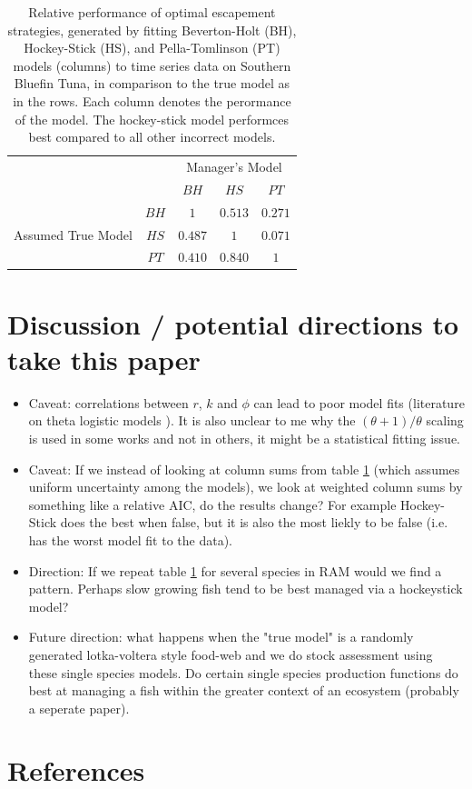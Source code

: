 \documentclass[]{elsarticle} %
\begin{document}
\begin{table}[!htbp]
	\setlength{\extrarowheight}{2pt}
	\begin{tabular}{cc|c|c|c|}
		& \multicolumn{1}{c}{} & \multicolumn{3}{c}{Manager's Model} \\
		& \multicolumn{1}{c}{} & \multicolumn{1}{c}{$BH$}  & \multicolumn{1}{c}{$HS$}  & \multicolumn{1}{c}{$PT$} \\\cline{3-5}
		& $BH$ & $1$ & $0.513$ & $0.271$ \\ \cline{3-5}
		Assumed True Model  & $HS$ & $0.487$ & $1$ & $0.071$ \\\cline{3-5}
		& $PT$ & $0.410$ & $0.840$ & $1$ \\\cline{3-5}
	\end{tabular}
	\caption{Relative performance of optimal escapement strategies, generated by fitting Beverton-Holt (BH), Hockey-Stick (HS), and Pella-Tomlinson (PT) models (columns) to time series data on Southern Bluefin Tuna, in comparison to the true model as in the rows. Each column denotes the perormance of the model. The hockey-stick model performces best compared to all other incorrect models.}\label{table:tuna}
\end{table}

\section{Discussion / potential directions to take this paper}

\begin{itemize}
	\item Caveat: correlations between $r$, $k$ and $\phi$ can lead to poor model fits (literature on theta logistic models \citep{polansky2009,clark2010theta} ). It is also unclear to me why the $(\theta + 1)/\theta$ scaling is used in some works and not in others, it might be a statistical fitting issue.
	\item Caveat: If we instead of looking at column sums from  table \ref{table:tuna} (which assumes uniform uncertainty among the models), we look at weighted column sums by something like a relative AIC, do the results change? For example Hockey-Stick does the best when false, but it is also the most liekly to be false (i.e. has the worst model fit to the data).
	\item Direction: If we repeat table \ref{table:tuna} for several species in RAM would we find a pattern. Perhaps slow growing fish tend to be best managed via a hockeystick model?
	\item Future direction: what happens when the "true model" is a randomly generated lotka-voltera style food-web and we do stock assessment using these single species models. Do certain single species production functions do best at managing a fish within the greater context of an ecosystem (probably a seperate paper).
\end{itemize}          
          
\section*{References}\label{references}



\hypertarget{refs}{}
\end{document}

